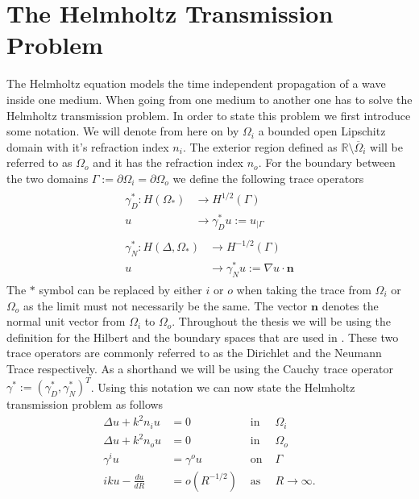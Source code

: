 \documentclass[a4paper, oneside]{discothesis}
\begin{document}
\section{The Helmholtz Transmission Problem}
The Helmholtz equation models the time independent propagation of a wave inside one medium.
When going from one medium to another one has to solve the Helmholtz transmission problem.
In order to state this problem we first introduce some notation.
We will denote from here on by $\Omega_i$ a bounded open Lipschitz domain with it's refraction index $n_i$.
The exterior region defined as $\mathbb{R} \setminus \overline{\Omega}_i$ will be referred to as $\Omega_o$ and it has the refraction index $n_o$.
For the boundary between the two domains $\Gamma := \partial\Omega_i = \partial\Omega_o$ we define the following trace operators
\begin{align}
	\begin{split}
		\gamma_D^*: H(\Omega_*) &\longrightarrow H^{1/2}(\Gamma) \\
		u &\longrightarrow \gamma_D^*u := u_{|\Gamma} 
	\end{split}
	\\
	\begin{split}
		\gamma_N^*: H(\Delta,\Omega_*) &\longrightarrow H^{-1/2}(\Gamma) \\
		u &\longrightarrow \gamma_N^*u := \nabla u \cdot \mathbf{n}
	\end{split}
\end{align}
The $*$ symbol can be replaced by either $i$ or $o$ when taking the trace from $\Omega_i$ or $\Omega_o$ as the limit must not necessarily be the same. The vector $\mathbf{n}$ denotes the normal unit vector from $\Omega_i$ to $\Omega_o$. 
Throughout the thesis we will be using the definition for the Hilbert and the boundary spaces that are used in \cite{anmcse}.
These two trace operators are commonly referred to as the Dirichlet and the Neumann Trace respectively.
As a shorthand we will be using the Cauchy trace operator $\gamma^* := (\gamma_D^*, \gamma_N^*)^T$.
Using this notation we can now state the Helmholtz transmission problem as follows
\begin{align}
	\Delta u + k^2n_iu &= 0 & \text{ in }& \Omega_i \\
	\Delta u + k^2n_ou &= 0 & \text{ in }& \Omega_o \\
	\gamma^iu &= \gamma^ou & \text{ on }& \Gamma \\
	iku - \frac{du}{dR} &= o(R^{-1/2}) & \text{ as }& R \rightarrow \infty \label{sfrc}.
\end{align}
\end{document}
